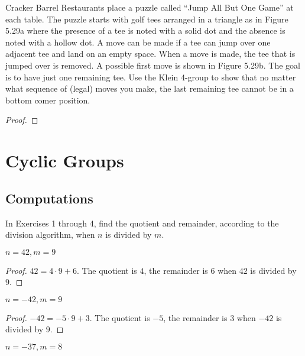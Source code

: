 \newpage
\begin{exercise}
    Cracker Barrel Restaurants place a puzzle called ``Jump All But One Game'' at each table. The puzzle starts with golf tees arranged in a triangle as in Figure 5.29a where the presence of a tee is noted with a solid dot and the absence is noted with a hollow dot. A move can be made if a tee can jump over one adjacent tee and land on an empty space. When a move is made, the tee that is jumped over is removed. A possible first move is shown in Figure 5.29b. The goal is to have just one remaining tee. Use the Klein 4-group to show that no matter what sequence of (legal) moves you make, the last remaining tee cannot be in a bottom comer position.
\end{exercise}

\begin{proof}
\end{proof}

\newpage
\section{Cyclic Groups}

\subsection*{Computations}

In Exercises 1 through 4, find the quotient and remainder, according to the division algorithm, when $n$ is divided by $m$.

\newpage
\begin{exercise}
    $n = 42, m = 9$
\end{exercise}

\begin{proof}
    $42 = 4\cdot 9 + 6$. The quotient is $4$, the remainder is $6$ when $42$ is divided by $9$.
\end{proof}

\newpage
\begin{exercise}
    $n = -42, m = 9$
\end{exercise}

\begin{proof}
    $-42 = -5 \cdot 9 + 3$. The quotient is $-5$, the remainder is $3$ when $-42$ is divided by $9$.
\end{proof}

\newpage
\begin{exercise}
    $n = -37, m = 8$
\end{exercise}

